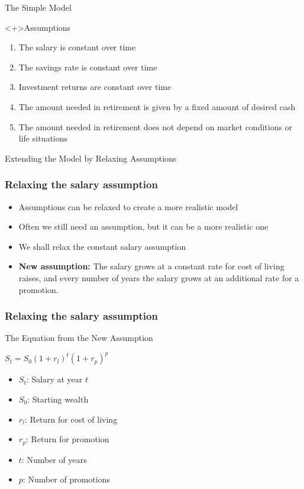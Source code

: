 \documentclass[handout, 11pt]{beamer}
\begin{document}
\begin{section}{The Simple Model}
\begin{frame}
\vfill
\begin{block}<+>{Assumptions}
\begin{enumerate}
\item The salary is constant over time
\item The savings rate is constant over time
\item Investment returns are constant over time
\item The amount needed in retirement is given by a fixed amount of desired cash
\item The amount needed in retirement does not depend on market conditions or life situations
\end{enumerate}
\end{block}
\end{frame}
\end{section}
\begin{section}{Extending the Model by Relaxing Assumptions}
\begin{frame}
\frametitle{Relaxing the salary assumption}
\begin{itemize}
\item Assumptions can be relaxed to create a more realistic model
\vfill
\item Often we still need an assumption, but it can be a more realistic one
\vfill
\item We shall relax the constant salary assumption
\vfill
\item \textbf{New assumption: }
The salary grows at a constant rate for cost of living raises, and every number of years the salary grows at an additional rate for a promotion.
\end{itemize}
\end{frame}
\begin{frame}
\frametitle{Relaxing the salary assumption}
\begin{block}{The Equation from the New Assumption}
\begin{center}
\begin{adjustbox}{width=0.9\textwidth, height=0.8\textheight, keepaspectratio}
$S_t = S_0 (1 + r_l)^t (1 + r_p)^p$
\end{adjustbox}
\end{center}
\begin{itemize}
\item $S_t$:  Salary at year $t$
\item $S_0$:  Starting wealth
\item $r_l$:  Return for cost of living
\item $r_p$:  Return for promotion
\item $t$:  Number of years
\item $p$:  Number of promotions
\end{itemize}
\end{block}
\end{frame}
\end{section}
\end{document}
